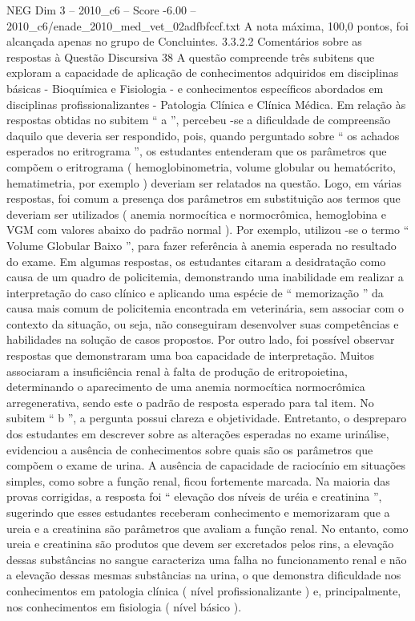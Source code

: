 \begin{textsample}{NEG Dim 3 – 2010\_c6 – Score -6.00 – 2010\_c6/enade\_2010\_med\_vet\_02adfbfccf.txt}
A nota máxima, 100,0 pontos, foi alcançada apenas no grupo de Concluintes. 3.3.2.2 Comentários sobre as respostas à Questão Discursiva 38 A questão compreende três subitens que exploram a capacidade de aplicação de conhecimentos adquiridos em disciplinas básicas - Bioquímica e Fisiologia - e conhecimentos específicos abordados em disciplinas profissionalizantes - Patologia Clínica e Clínica Médica.
Em relação às respostas obtidas no subitem “ a ”, percebeu -se a dificuldade de compreensão daquilo que deveria ser respondido, pois, quando perguntado sobre “ os achados esperados no eritrograma ”, os estudantes entenderam que os parâmetros que compõem o eritrograma ( hemoglobinometria, volume globular ou hematócrito, hematimetria, por exemplo ) deveriam ser relatados na questão.
Logo, em várias respostas, foi comum a presença dos parâmetros em substituição aos termos que deveriam ser utilizados ( anemia normocítica e normocrômica, hemoglobina e VGM com valores abaixo do padrão normal ).
Por exemplo, utilizou -se o termo “ Volume Globular Baixo ”, para fazer referência à anemia esperada no resultado do exame.
Em algumas respostas, os estudantes citaram a desidratação como causa de um quadro de policitemia, demonstrando uma inabilidade em realizar a interpretação do caso clínico e aplicando uma espécie de “ memorização ” da causa mais comum de policitemia encontrada em veterinária, sem associar com o contexto da situação, ou seja, não conseguiram desenvolver suas competências e habilidades na solução de casos propostos.
Por outro lado, foi possível observar respostas que demonstraram uma boa capacidade de interpretação.
Muitos associaram a insuficiência renal à falta de produção de eritropoietina, determinando o aparecimento de uma anemia normocítica normocrômica arregenerativa, sendo este o padrão de resposta esperado para tal item.
No subitem “ b ”, a pergunta possui clareza e objetividade.
Entretanto, o despreparo dos estudantes em descrever sobre as alterações esperadas no exame urinálise, evidenciou a ausência de conhecimentos sobre quais são os parâmetros que compõem o exame de urina.
A ausência de capacidade de raciocínio em situações simples, como sobre a função renal, ficou fortemente marcada.
Na maioria das provas corrigidas, a resposta foi “ elevação dos níveis de uréia e creatinina ”, sugerindo que esses estudantes receberam conhecimento e memorizaram que a ureia e a creatinina são parâmetros que avaliam a função renal.
No entanto, como ureia e creatinina são produtos que devem ser excretados pelos rins, a elevação dessas substâncias no sangue caracteriza uma falha no funcionamento renal e não a elevação dessas mesmas substâncias na urina, o que demonstra dificuldade nos conhecimentos em patologia clínica ( nível profissionalizante ) e, principalmente, nos conhecimentos em fisiologia ( nível básico ).

\end{textsample}
